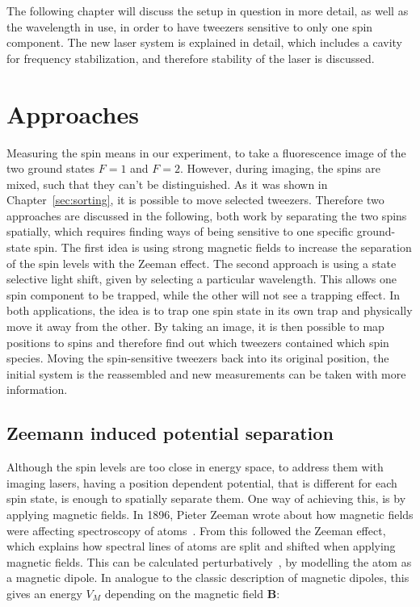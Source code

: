 The following chapter will discuss the setup in question in more detail, as well as the wavelength in use, in order to have tweezers sensitive to only one spin component. The new laser system is explained in detail, which includes a cavity for frequency stabilization, and therefore stability of the laser is discussed.

\section{Approaches}

Measuring the spin means in our experiment, to take a fluorescence image of the two ground states $F=1$ and $F=2$. However, during imaging, the spins are mixed, such that they can't be distinguished. As it was shown in Chapter~\ref{sec:sorting}, it is possible to move selected tweezers. Therefore two approaches are discussed in the following, both work by separating the two spins spatially, which requires finding ways of being sensitive to one specific ground-state spin. The first idea is using strong magnetic fields to increase the separation of the spin levels with the Zeeman effect. The second approach is using a state selective light shift, given by selecting a particular wavelength. This allows one spin component to be trapped, while the other will not see a trapping effect. In both applications, the idea is to trap one spin state in its own trap and physically move it away from the other. By taking an image, it is then possible to map positions to spins and therefore find out which tweezers contained which spin species. Moving the spin-sensitive tweezers back into its original position, the initial system is the reassembled and new measurements can be taken with more information.

\subsection{Zeemann induced potential separation}

Although the spin levels are too close in energy space, to address them  with imaging lasers, having a position dependent potential, that is different for each spin state, is enough to spatially separate them. One way of achieving this, is by applying magnetic fields. In 1896, Pieter Zeeman wrote about how magnetic fields were affecting spectroscopy of atoms~\cite{Zeeman1896}. From this followed the Zeeman effect, which explains how spectral lines of atoms are split and shifted when applying magnetic fields. This can be calculated perturbatively~\cite{Griffiths2004}, by modelling the atom as a magnetic dipole. In analogue to the classic description of magnetic dipoles, this gives an energy $V_M$ depending on the magnetic field $\bm{B}$:

